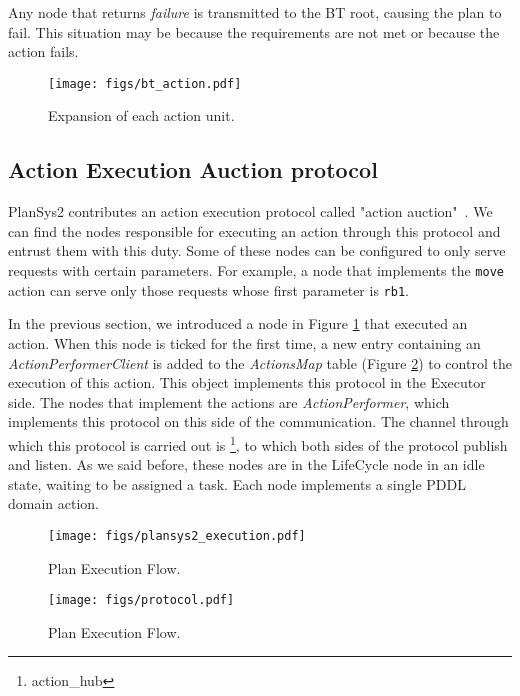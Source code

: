 \documentclass[letterpaper, 10 pt, conference]{IEEEtran}
\begin{document}
Any node that returns \emph{failure} is transmitted to the BT root, causing the plan to fail. This situation may be because the requirements are not met or because the action fails.

\begin{figure}[ht]
  \centering
  \texttt{[image: figs/bt\_action.pdf]}
  \caption{Expansion of each action unit.}
  \label{fig:bt5}
\end{figure}

\subsection{Action Execution Auction protocol}

PlanSys2 contributes an action execution protocol called "action auction"~\cite{lagoudakis2004simple}. We can find the nodes responsible for executing an action through this protocol and entrust them with this duty. Some of these nodes can be configured to only serve requests with certain parameters. For example, a node that implements the \small\texttt{move }\normalsize action can serve only those requests whose first parameter is \small\texttt{rb1}\normalsize.

In the previous section, we introduced a node in Figure \ref{fig:bt5} that executed an action. When this node is ticked for the first time, a new entry containing an \emph{ActionPerformerClient} is added to the \emph{ActionsMap} table (Figure \ref{fig:plansys2_execution}) to control the execution of this action. This object implements this protocol in the Executor side. The nodes that implement the actions are \emph{ActionPerformer}, which implements this protocol on this side of the communication. The channel through which this protocol is carried out is \footnote{action\_hub}\normalsize, to which both sides of the protocol publish and listen. As we said before, these nodes are in the LifeCycle node in an idle state, waiting to be assigned a task. Each node implements a single PDDL domain action.

\begin{figure}[tb]
  \centering
  \texttt{[image: figs/plansys2\_execution.pdf]}
  \caption{Plan Execution Flow.}
  \label{fig:plansys2_execution}
\end{figure}

\begin{figure*}[tb]
  \centering
  \texttt{[image: figs/protocol.pdf]}
  \caption{Plan Execution Flow.}
  \label{fig:protocol}
\end{figure*}
\end{document}
